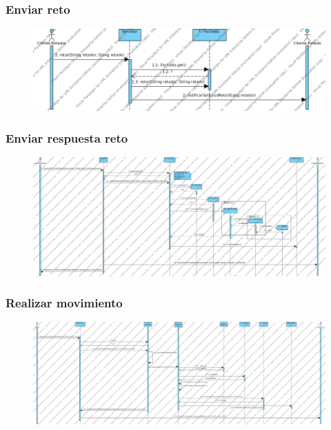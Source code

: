   \subsubsection{Enviar reto}
 \begin{figure}[h]
 \centering
 \includegraphics[scale=0.7]{img/ds_EnviarRetoServidor.png}
 \end{figure}
 \clearpage
 \subsubsection{Enviar respuesta reto}
 \begin{landscape}
 \begin{figure}[h]
 \centering
 \includegraphics[scale=0.4]{img/ds_EnviarRespuestaRetoServidor.png}
 \end{figure}
  \end{landscape}
 \clearpage
\subsubsection{Realizar movimiento}
\begin{landscape}
 \begin{figure}[h]
 \centering
 \includegraphics[scale=0.4]{img/ds_RealizarMovimientoServidor.png}
 \end{figure}
 \end{landscape}
 \clearpage

